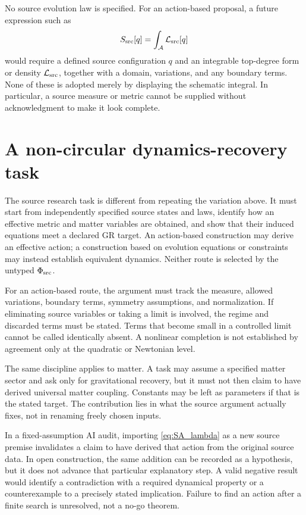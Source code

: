 \documentclass[11pt]{article}
\begin{document}
No source evolution law is specified. For an action-based proposal, a future expression such as
\begin{equation}
S_{\rm src}[q]=\int_{\mathcal A}\mathcal L_{\rm src}[q]
\label{eq:substrateaction}
\end{equation}
would require a defined source configuration $q$ and an integrable top-degree form or density $\mathcal L_{\rm src}$, together with a domain, variations, and any boundary terms. None of these is adopted merely by displaying the schematic integral. In particular, a source measure or metric cannot be supplied without acknowledgment to make it look complete.

\section{A non-circular dynamics-recovery task}
The source research task is different from repeating the variation above. It must start from independently specified source states and laws, identify how an effective metric and matter variables are obtained, and show that their induced equations meet a declared GR target. An action-based construction may derive an effective action; a construction based on evolution equations or constraints may instead establish equivalent dynamics. Neither route is selected by the untyped $\Phi_{\mathrm{src}}$.

For an action-based route, the argument must track the measure, allowed variations, boundary terms, symmetry assumptions, and normalization. If eliminating source variables or taking a limit is involved, the regime and discarded terms must be stated. Terms that become small in a controlled limit cannot be called identically absent. A nonlinear completion is not established by agreement only at the quadratic or Newtonian level.

The same discipline applies to matter. A task may assume a specified matter sector and ask only for gravitational recovery, but it must not then claim to have derived universal matter coupling. Constants may be left as parameters if that is the stated target. The contribution lies in what the source argument actually fixes, not in renaming freely chosen inputs.

In a fixed-assumption AI audit, importing \eqref{eq:SA_lambda} as a new source premise invalidates a claim to have derived that action from the original source data. In open construction, the same addition can be recorded as a hypothesis, but it does not advance that particular explanatory step. A valid negative result would identify a contradiction with a required dynamical property or a counterexample to a precisely stated implication. Failure to find an action after a finite search is unresolved, not a no-go theorem.
\end{document}
